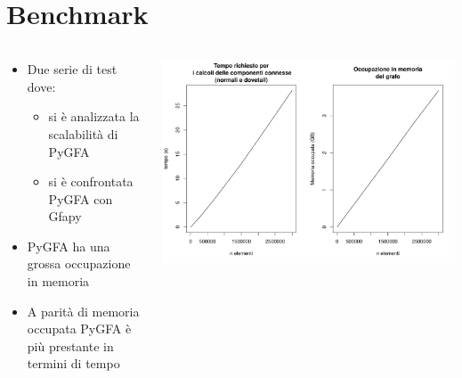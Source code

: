\documentclass{beamer}
\begin{document}
\section{Benchmark}
\begin{frame}{\secname}
	\begin{columns}
		\begin{column}{0.5\textwidth}

			\begin{itemize}
				\item Due serie di test dove:
					\begin{itemize}
						\item si è analizzata la scalabilità di PyGFA
						\item si è confrontata PyGFA con Gfapy
					\end{itemize}
				\item PyGFA ha una grossa occupazione in memoria
				\item A parità di memoria occupata PyGFA è più prestante in termini di tempo
			\end{itemize}

		\end{column}
		\begin{column}{0.5\textwidth}
			\centering
			\includegraphics[height=0.45\textheight, width=\textwidth, keepaspectratio]{bench_singular}


\end{column}
\end{columns}
\end{frame}
\end{document}
